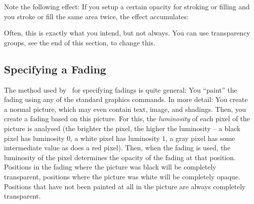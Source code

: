 Note the following effect: If you setup a certain opacity for stroking
or filling and you stroke or fill the same area twice, the effect
accumulates:

\begin{codeexample}[]
\end{codeexample}

Often, this is exactly what you intend, but not always. You can use
transparency groups, see the end of this section, to change this.


\subsection{Specifying a Fading}

The method used by \pgfname\ for specifying fadings is quite
general: You ``paint'' the fading using any of the standard graphics
commands. In more detail: You create a normal picture, which may even
contain text, image, and shadings. Then, you create a fading based on
this picture. For this, the \emph{luminosity} of each pixel of the
picture is analysed (the brighter the pixel, the higher the luminosity
-- a black pixel has luminosity $0$, a white pixel has luminosity $1$,
a gray pixel has some intermediate value as does a red pixel). Then,
when the fading is used, the luminosity of the pixel determines the
opacity of the fading at that position. Positions in the fading where
the picture was black will be completely transparent, positions where
the picture was white will be completely opaque. Positions that have
not been painted at all in the picture are always completely
transparent.


